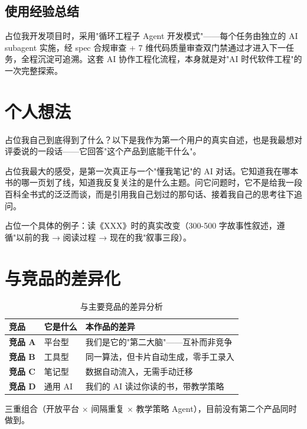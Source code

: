 \documentclass[12pt,a4paper,nomath]{harryopo-report}
\begin{document}
\subsection{使用经验总结}
{占位}我开发项目时，采用"循环工程子 Agent 开发模式"——每个任务由独立的 AI subagent 实施，经 spec 合规审查 + 7 维代码质量审查双门禁通过才进入下一任务，全程沉淀可追溯。这套 AI 协作工程化流程，本身就是对"AI 时代软件工程"的一次完整探索。
\fi

\ifshowthoughts
\section{个人想法}
{占位}我自己到底得到了什么？以下是我作为第一个用户的真实自述，也是我最想对评委说的一段话——它回答"这个产品到底能干什么"。

{占位}我最大的感受，是第一次真正与一个"懂我笔记"的 AI 对话。它知道我在哪本书的哪一页划了线，知道我反复关注的是什么主题。问它问题时，它不是给我一段百科全书式的泛泛而谈，而是引用我自己划过的那句话、接着我自己的思考往下追问。

{占位}一个具体的例子：读《XXX》时的真实改变（300-500 字故事性叙述，遵循"以前的我 → 阅读过程 → 现在的我"叙事三段）。
\fi

\ifshowcompetitors
\section{与竞品的差异化}
\begin{table}[htbp]
\centering
\begin{tabularx}{\textwidth}{>{\bfseries}l X X}
\toprule
\textbf{竞品} & \textbf{它是什么} & \textbf{本作品的差异} \\
\midrule
竞品 A & 平台型 & 我们是它的"第二大脑"——互补而非竞争 \\
竞品 B & 工具型 & 同一算法，但卡片自动生成，零手工录入 \\
竞品 C & 笔记型 & 数据自动流入，无需手动迁移 \\
竞品 D & 通用 AI & 我们的 AI 读过你读的书，带教学策略 \\
\bottomrule
\end{tabularx}
\caption{与主要竞品的差异分析}
\label{tab:competitors}
\end{table}

三重组合（开放平台 × 间隔重复 × 教学策略 Agent），目前没有第二个产品同时做到。
\fi

\ifshowreviewdetail
\end{document}
